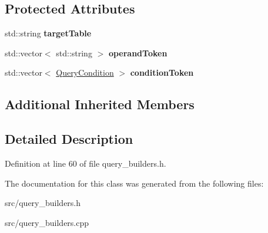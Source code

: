\subsection*{Protected Attributes}
\begin{DoxyCompactItemize}
\item 
\mbox{\label{class_complex_query_builder_ae8285f6ee5ac598c2593411badf674b7}} 
std\+::string {\bfseries target\+Table}
\item 
\mbox{\label{class_complex_query_builder_a40cee0c08e7fc932cd1a2d418d23da94}} 
std\+::vector$<$ std\+::string $>$ {\bfseries operand\+Token}
\item 
\mbox{\label{class_complex_query_builder_aa230f7984124087dba13a40f16d1c5a7}} 
std\+::vector$<$ \hyperlink{struct_query_condition}{Query\+Condition} $>$ {\bfseries condition\+Token}
\end{DoxyCompactItemize}
\subsection*{Additional Inherited Members}


\subsection{Detailed Description}


Definition at line 60 of file query\+\_\+builders.\+h.



The documentation for this class was generated from the following files\+:\begin{DoxyCompactItemize}
\item 
src/query\+\_\+builders.\+h\item 
src/query\+\_\+builders.\+cpp\end{DoxyCompactItemize}
